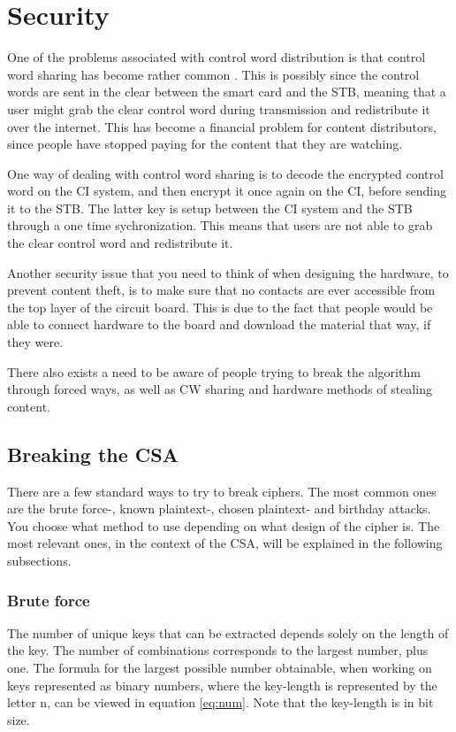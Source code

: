 \section{Security}
One of the problems associated with control word distribution is that 
control word sharing has become rather common \citep{Farncombe}. This 
is possibly since the control words are sent in the clear between the 
smart card and the STB, meaning that a user might grab the clear 
control word during transmission and redistribute it over the internet. 
This has become a financial problem for content distributors, since 
people have stopped paying for the content that they are watching.

One way of dealing with control word sharing is to decode the encrypted 
control word on the CI system, and then encrypt it once again on the CI,
before sending it to the STB. The latter key is setup between the CI 
system and the STB through a one time sychronization. This means that 
users are not able to grab the clear control word and redistribute it. 
\citep[pp. 12--13]{HIS:2011}

Another security issue that you need to think of when designing the 
hardware, to prevent content theft, is to make sure that no contacts 
are ever accessible from the top layer of the circuit board. This is 
due to the fact that people would be able to connect hardware to the 
board and download the material that way, if they were. 

There also exists a need to be aware of people trying to break the 
algorithm through forced ways, as well as CW sharing and hardware 
methods of stealing content.

\subsection{Breaking the CSA}
There are a few standard ways to try to break ciphers. The most common 
ones are the brute force-, known plaintext-, chosen plaintext- and 
birthday attacks. You choose what method to use depending on what design
of the cipher is. The most relevant ones, in the context of the CSA, 
will be explained in the following subsections. 
\citep[pp. 31-34]{Schneier:2003}

\subsubsection{Brute force}
The number of unique keys that can be extracted depends solely on the 
length of the key. The number of combinations corresponds to the 
largest number, plus one. The formula for the largest possible number 
obtainable, when working on keys represented as binary numbers, where 
the key-length is represented by the letter n, can be viewed in equation
\ref{eq:num}. Note that the key-length is in bit size.

